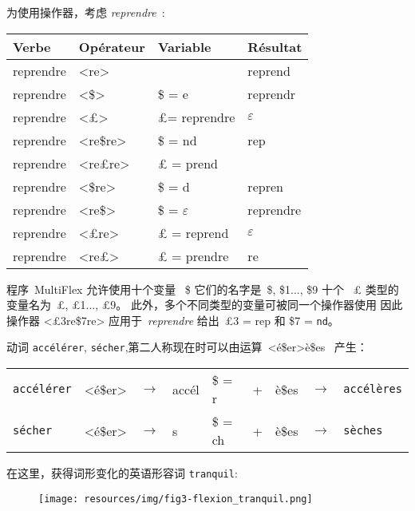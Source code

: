 \noindent
为使用操作器，考虑 {\it reprendre}~:

\bigskip
\begin{center}
\begin{tabular}{|l|l|l|l|}
\hline
Verbe     & Opérateur & Variable & Résultat\\
\hline
\hline
reprendre & <re> & & reprend\\
reprendre & <\$> & \$ = e & reprendr\\
reprendre & <{\pounds}> &{\pounds}= reprendre & $\varepsilon$ \\
reprendre & <re\$re> & \$ = nd & rep\\
reprendre & <re{\pounds}re> & {\pounds} = prend & \\
reprendre & <\$re> & \$ = d & repren\\
reprendre & <re\$> & \$ =  $\varepsilon$ & reprendre\\
reprendre & <{\pounds}re> & {\pounds} = reprend & $\varepsilon$\\
reprendre & <re{\pounds}> & {\pounds} = prendre & re\\
\hline
\end{tabular}
\end{center}

\bigskip
\noindent
程序\ MultiFlex 允许使用十个变量 \ \$ 它们的名字是\  \$, \$1..., \$9
十个 \ {\pounds} 类型的变量名为\  {\pounds}, {\pounds}1..., {\pounds}9。 此外，多个不同类型的变量可被同一个操作器使用
因此操作器 <{\pounds}3re\$7re> 应用于\ {\it reprendre} 给出\ {\pounds}3 = 
 rep 和 \$7 = \verb+nd+。

\bigskip
\noindent
动词 \verb+accélérer+, \verb+sécher+,第二人称现在时可以由运算\ <é\$er>è\$es~ 产生： 

\begin{center}
\begin{tabular}{lllllllll}
	\verb+accélérer+ & <é\$er> & $\rightarrow$ & accél & \$ = r & + & è\$es &  $\rightarrow$ & \verb+accélères+\\
	\verb+sécher+ & <é\$er> & $\rightarrow$ & s & \$ = ch & + & è\$es & $\rightarrow$ & \verb+sèches+\\
\end{tabular}
\end{center}


\noindent 在这里，获得词形变化的英语形容词 \verb+tranquil+:

\bigskip
\begin{figure}[!ht]
\begin{center}
\texttt{[image: resources/img/fig3-flexion\_tranquil.png]}
\end{center}
\end{figure}

